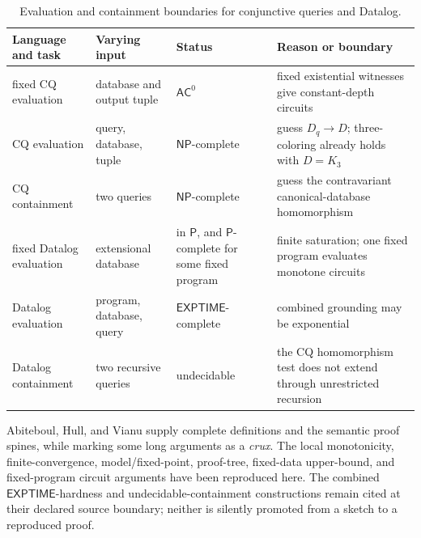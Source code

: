 \begin{table}[htbp]
\centering\scriptsize
\begin{tabularx}{\textwidth}{@{}l X l X@{}}
\toprule
Language and task & Varying input & Status & Reason or boundary \\
\midrule
fixed CQ evaluation & database and output tuple & \(\mathsf{AC}^{0}\) &
fixed existential witnesses give constant-depth circuits \\
CQ evaluation & query, database, tuple & \(\mathsf{NP}\)-complete &
guess \(D_q\to D\); three-coloring already holds with \(D=K_3\) \\
CQ containment & two queries & \(\mathsf{NP}\)-complete &
guess the contravariant canonical-database homomorphism \\
fixed Datalog evaluation & extensional database & in \(\mathsf P\), and
\(\mathsf P\)-complete for some fixed program & finite saturation; one fixed
program evaluates monotone circuits \\
Datalog evaluation & program, database, query &
\(\mathsf{EXPTIME}\)-complete & combined grounding may be exponential \\
Datalog containment & two recursive queries & undecidable &
the CQ homomorphism test does not extend through unrestricted recursion \\
\bottomrule
\end{tabularx}
\caption{Evaluation and containment boundaries for conjunctive queries and
Datalog.}
\label{tab:p09-cq-datalog-boundaries}
\end{table}

Abiteboul, Hull, and Vianu supply complete definitions and the semantic proof
spines, while marking some long arguments as a \emph{crux}.  The local
monotonicity, finite-convergence, model/fixed-point, proof-tree, fixed-data
upper-bound, and fixed-program circuit arguments have been reproduced here.
The combined \(\mathsf{EXPTIME}\)-hardness and undecidable-containment
constructions remain cited at their declared source boundary; neither is
silently promoted from a sketch to a reproduced proof.
